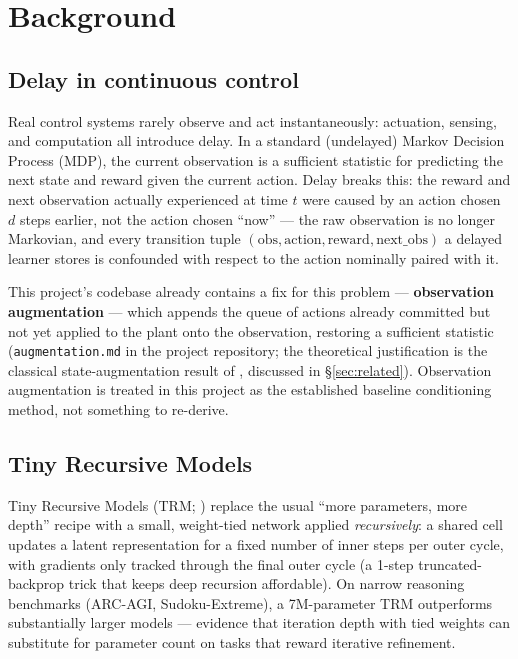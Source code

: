\documentclass[11pt]{article}
\begin{document}
\section{Background}

\subsection{Delay in continuous control}

Real control systems rarely observe and act instantaneously: actuation, sensing, and computation all introduce delay. In a standard (undelayed) Markov Decision Process (MDP), the current observation is a sufficient statistic for predicting the next state and reward given the current action. Delay breaks this: the reward and next observation actually experienced at time $t$ were caused by an action chosen $d$ steps earlier, not the action chosen ``now'' --- the raw observation is no longer Markovian, and every transition tuple $(\text{obs}, \text{action}, \text{reward}, \text{next\_obs})$ a delayed learner stores is confounded with respect to the action nominally paired with it.

This project's codebase already contains a fix for this problem --- \textbf{observation augmentation} --- which appends the queue of actions already committed but not yet applied to the plant onto the observation, restoring a sufficient statistic (\texttt{augmentation.md} in the project repository; the theoretical justification is the classical state-augmentation result of \citet{katsikopoulos2003delayed}, discussed in \S\ref{sec:related}). Observation augmentation is treated in this project as the established baseline conditioning method, not something to re-derive.

\subsection{Tiny Recursive Models}

Tiny Recursive Models (TRM; \citealp{jolicoeurmartineau2025trm}) replace the usual ``more parameters, more depth'' recipe with a small, weight-tied network applied \emph{recursively}: a shared cell updates a latent representation for a fixed number of inner steps per outer cycle, with gradients only tracked through the final outer cycle (a 1-step truncated-backprop trick that keeps deep recursion affordable). On narrow reasoning benchmarks (ARC-AGI, Sudoku-Extreme), a 7M-parameter TRM outperforms substantially larger models --- evidence that iteration depth with tied weights can substitute for parameter count on tasks that reward iterative refinement.
\end{document}
